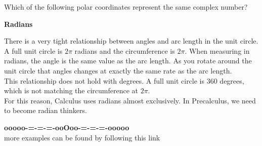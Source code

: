 \documentclass{ximera}
\begin{document}
\begin{question}
Which of the following polar coordinates represent the same complex number?
\begin{selectAll}
\end{selectAll}
\end{question}








\begin{warning} \textbf{\textcolor{red!80!black}{Radians}}


There is a very tight relationship between angles and arc length in the unit circle. \\


A full unit circle is $2\pi$ radians and the circumference is $2\pi$. When measuring in radians, the angle is the same value as the arc length.  As you rotate around the unit circle that angles changes at exactly the same rate as the arc length. \\

This relationship does not hold with degrees. A full unit circle is $360$ degrees, which is not matching  the circumference at $2\pi$. \\


For this reason, Calculus uses radians almost exclusively.  In Precalculus, we need to become radian thinkers.





\end{warning}










\begin{center}
\textbf{\textcolor{green!50!black}{ooooo-=-=-=-ooOoo-=-=-=-ooooo}} \\

more examples can be found by following this link\\ 

\end{center}
\end{document}
